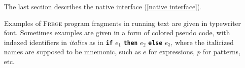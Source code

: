 \documentclass[a4paper,landscape,twocolumn]{report}
\newenvironment{code}[0]{\verbatim}{\endverbatim}
\newcommand{\frege}[0]{\textsc{Frege}}
\newcommand{\qq}[1]{"#1"}
\newcommand{\term}[1]{\textbf{\texttt{\textcolor{trmred}{#1}}}}
\begin{document}
The last section describes  the native interface
(\autoref{native interface}).

Examples of \frege{} program fragments in running text are given in
typewriter font. Sometimes examples are given in a form of
colored pseudo code,
with indexed identifiers in \emph{italics} as in \term{if} $e_1$
\term{then} $e_2$ \term{else} $e_3$, where the  italicized names are
supposed to be mnemonic, such as $e$ for expressions, $p$ for patterns,
etc.






%


\appendix


%
%
\end{document}
